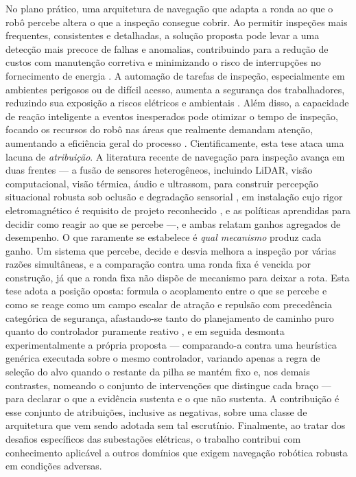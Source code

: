 No plano prático, uma arquitetura de navegação que adapta a ronda ao que o robô percebe altera o que a inspeção consegue cobrir. Ao permitir inspeções mais frequentes, consistentes e detalhadas, a solução proposta pode levar a uma detecção mais precoce de falhas e anomalias, contribuindo para a redução de custos com manutenção corretiva e minimizando o risco de interrupções no fornecimento de energia \cite{Wei2024Advancements}. A automação de tarefas de inspeção, especialmente em ambientes perigosos ou de difícil acesso, aumenta a segurança dos trabalhadores, reduzindo sua exposição a riscos elétricos e ambientais \cite{Anybotics2023Advantages}. Além disso, a capacidade de reação inteligente a eventos inesperados pode otimizar o tempo de inspeção, focando os recursos do robô nas áreas que realmente demandam atenção, aumentando a eficiência geral do processo \cite{EnergyRobotics2024Future}.
Cientificamente, esta tese ataca uma lacuna de \emph{atribuição}. A literatura recente de navegação para inspeção avança em duas frentes --- a fusão de sensores heterogêneos, incluindo \ac{LiDAR}, visão computacional, visão térmica, áudio e ultrassom, para construir percepção situacional robusta sob oclusão e degradação sensorial \cite{Alatise2020Review, Ou2024SensorFusionDRL}, em instalação cujo rigor eletromagnético é requisito de projeto reconhecido \cite{He2007EMCSubstation}, e as políticas aprendidas para decidir como reagir ao que se percebe \cite{Zhu2017, Kahn2021} ---, e ambas relatam ganhos agregados de desempenho. O que raramente se estabelece é \emph{qual mecanismo} produz cada ganho. Um sistema que percebe, decide e desvia melhora a inspeção por várias razões simultâneas, e a comparação contra uma ronda fixa é vencida por construção, já que a ronda fixa não dispõe de mecanismo para deixar a rota. Esta tese adota a posição oposta: formula o acoplamento entre o que se percebe e como se reage como um campo escalar de atração e repulsão com precedência categórica de segurança, afastando-se tanto do planejamento de caminho puro quanto do controlador puramente reativo \cite{Wijayathunga2023Challenges}, e em seguida desmonta experimentalmente a própria proposta --- comparando-a contra uma heurística genérica executada sobre o mesmo controlador, variando apenas a regra de seleção do alvo quando o restante da pilha se mantém fixo e, nos demais contrastes, nomeando o conjunto de intervenções que distingue cada braço --- para declarar o que a evidência sustenta e o que não sustenta. A contribuição é esse conjunto de atribuições, inclusive as negativas, sobre uma classe de arquitetura que vem sendo adotada sem tal escrutínio. Finalmente, ao tratar dos desafios específicos das subestações elétricas, o trabalho contribui com conhecimento aplicável a outros domínios que exigem navegação robótica robusta em condições adversas.


